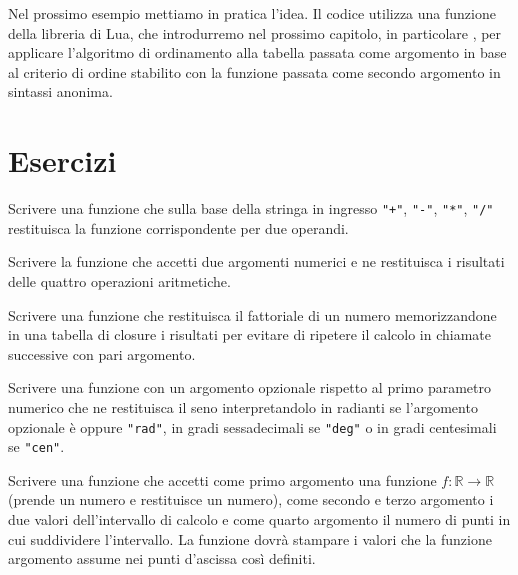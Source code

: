 Nel prossimo esempio mettiamo in pratica l'idea. Il codice utilizza una
funzione della libreria di Lua, che introdurremo nel prossimo capitolo, in
particolare , per applicare l'algoritmo di ordinamento alla
tabella passata come argomento in base al criterio di ordine stabilito con la
funzione passata come secondo argomento in sintassi anonima.


\section{Esercizi}

\begin{Exercise}[label=fn-01]
Scrivere una funzione che sulla base della stringa in ingresso \verb|"+"|,
\verb|"-"|, \verb|"*"|, \verb|"/"| restituisca la funzione corrispondente per
due operandi.
\end{Exercise}

\begin{Exercise}[label=fn-02]
Scrivere la funzione che accetti due argomenti numerici e ne restituisca i
risultati delle quattro operazioni aritmetiche.
\end{Exercise}

\begin{Exercise}[label=fn-03]
Scrivere una funzione che restituisca il fattoriale di un numero memorizzandone
in una tabella di closure i risultati per evitare di ripetere il calcolo in
chiamate successive con pari argomento.
\end{Exercise}

\begin{Exercise}[label=fn-04]
Scrivere una funzione con un argomento opzionale rispetto al primo parametro
numerico che ne restituisca il seno interpretandolo in radianti se l'argomento
opzionale è  oppure \verb|"rad"|, in gradi sessadecimali se
\verb|"deg"| o in gradi centesimali se \verb|"cen"|.
\end{Exercise}

\begin{Exercise}[label=fn-05]
Scrivere una funzione che accetti come primo argomento una funzione \( f:
ℝ \to ℝ \) (prende un numero e restituisce un numero), come
secondo e terzo argomento i due valori dell'intervallo di calcolo e come quarto
argomento il numero di punti in cui suddividere l'intervallo. La funzione dovrà
stampare i valori che la funzione argomento assume nei punti d'ascissa così
definiti.
\end{Exercise}


